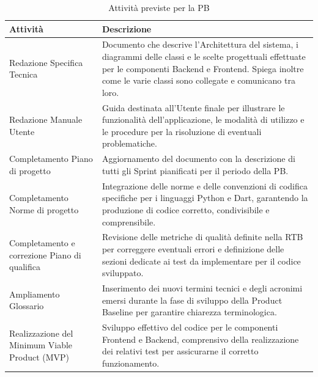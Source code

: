 \documentclass[a4paper,12pt]{article}
\begin{document}
\begin{table}[H]
    \centering
    \renewcommand{\arraystretch}{1.5}
    \begin{tabularx}{\textwidth}{|L|Z|}
        \hline
        \textbf{Attività} & \textbf{Descrizione} \\
        \hline
        Redazione Specifica Tecnica & Documento che descrive l'Architettura del sistema, i diagrammi delle classi e le scelte progettuali effettuate per le componenti Backend e Frontend. Spiega inoltre come le varie classi sono collegate e comunicano tra loro. \\
        \hline
        Redazione Manuale Utente & Guida destinata all'Utente finale per illustrare le funzionalità dell'applicazione, le modalità di utilizzo e le procedure per la risoluzione di eventuali problematiche. \\
        \hline
        Completamento Piano di progetto & Aggiornamento del documento con la descrizione di tutti gli Sprint pianificati per il periodo della PB. \\
        \hline
        Completamento Norme di progetto & Integrazione delle norme e delle convenzioni di codifica specifiche per i linguaggi Python e Dart, garantendo la produzione di codice corretto, condivisibile e comprensibile. \\
        \hline
        Completamento e correzione Piano di qualifica & Revisione delle metriche di qualità definite nella RTB per correggere eventuali errori e definizione delle sezioni dedicate ai test da implementare per il codice sviluppato. \\
        \hline
        Ampliamento Glossario & Inserimento dei nuovi termini tecnici e degli acronimi emersi durante la fase di sviluppo della Product Baseline per garantire chiarezza terminologica. \\
        \hline
        Realizzazione del Minimum Viable Product (MVP) & Sviluppo effettivo del codice per le componenti Frontend e Backend, comprensivo della realizzazione dei relativi test per assicurarne il corretto funzionamento. \\
        \hline
    \end{tabularx}
    \caption{Attività previste per la PB}
    \label{tab:attivita_pb}
\end{table}
\end{document}
